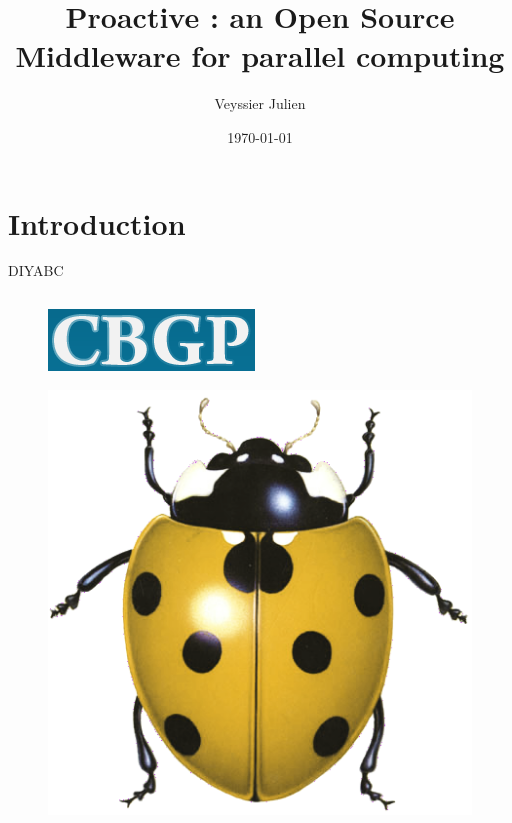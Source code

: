 \documentclass{beamer}
\title{Proactive : an Open Source Middleware for parallel computing}
\author{Veyssier Julien}
\institute{CBGP- INRA}
\date\today
\begin{document}
\begin{frame}
\titlepage
\end{frame}

\begin{frame}
\tableofcontents
\end{frame}

\section[Introduction]{Introduction}
\begin{frame}
	\tableofcontents[currentsection]
\end{frame}

\begin{frame}{DIYABC}
	\begin{columns}
	\begin{column}[l]{0.5\linewidth}
        \begin{figure}
            \centering
            \includegraphics[scale=0.39]{cbgp.png}
        \end{figure}
        \begin{figure}
            \centering
            \includegraphics[scale=0.39]{cocci.png}
        \end{figure}


\end{column}
\end{columns}
\end{frame}
\end{document}
